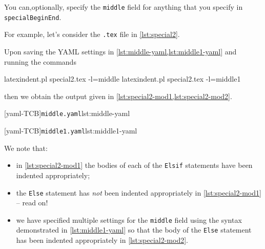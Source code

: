  You can,optionally, specify  the
 \texttt{middle} field for anything that you specify in \texttt{specialBeginEnd}.

 \begin{example}
 For example, let's consider the \texttt{.tex} file in \cref{lst:special2}.


 Upon saving the YAML settings in \cref{lst:middle-yaml,lst:middle1-yaml} and running the
 commands 

 \begin{commandshell}
latexindent.pl special2.tex -l=middle
latexindent.pl special2.tex -l=middle1
\end{commandshell}

 then we obtain the output given in \cref{lst:special2-mod1,lst:special2-mod2}.

 \begin{cmhtcbraster}
  [yaml-TCB]{\texttt{middle.yaml}}{lst:middle-yaml}
 \end{cmhtcbraster}

 \begin{cmhtcbraster}
  [yaml-TCB]{\texttt{middle1.yaml}}{lst:middle1-yaml}
 \end{cmhtcbraster}

 We note that:
 \begin{itemize}
  \item in \cref{lst:special2-mod1} the bodies of each of the \texttt{Elsif} statements
        have been indented appropriately;
  \item the \texttt{Else} statement has \emph{not} been indented appropriately in
        \cref{lst:special2-mod1} -- read on!
  \item we have specified multiple settings for the \texttt{middle} field using the
        syntax demonstrated in \cref{lst:middle1-yaml} so that the body of the
        \texttt{Else} statement has been indented appropriately in
        \cref{lst:special2-mod2}.
 \end{itemize}
 \end{example}


